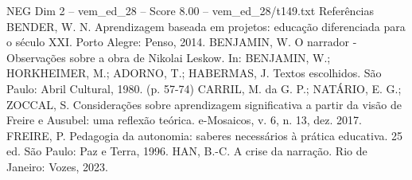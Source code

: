 \begin{textsample}{NEG Dim 2 – vem\_ed\_28 – Score 8.00 – vem\_ed\_28/t149.txt}
Referências BENDER, W.
N.
Aprendizagem baseada em projetos: educação diferenciada para o século XXI.
Porto Alegre: Penso, 2014.
BENJAMIN, W.
O narrador - Observações sobre a obra de Nikolai Leskow.
In: BENJAMIN, W.; HORKHEIMER, M.; ADORNO, T.; HABERMAS, J.
Textos escolhidos.
São Paulo: Abril Cultural, 1980. (p. 57-74) CARRIL, M. da G.
P.; NATÁRIO, E.
G.; ZOCCAL, S.
Considerações sobre aprendizagem significativa a partir da visão de Freire e Ausubel: uma reflexão teórica. e-Mosaicos, v. 6, n. 13, dez. 2017.
FREIRE, P.
Pedagogia da autonomia: saberes necessários à prática educativa. 25 ed.
São Paulo: Paz e Terra, 1996.
HAN, B.-C.
A crise da narração.
Rio de Janeiro: Vozes, 2023.

\end{textsample}
